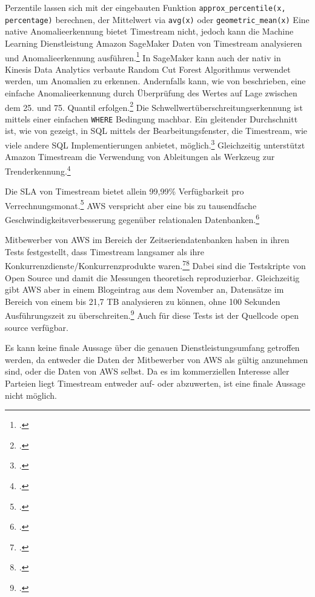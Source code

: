
\label{anhang:vergleich-timestream}
Perzentile lassen sich mit der eingebauten Funktion \texttt{approx_percentile(x, percentage)} berechnen, der Mittelwert via \texttt{avg(x)} oder \texttt{geometric_mean(x)}
Eine native Anomalieerkennung bietet Timestream nicht, jedoch kann die Machine Learning Dienstleistung Amazon SageMaker Daten von Timestream analysieren und Anomalieerkennung ausführen.\footcite[Vgl. auch im Folgenden][]{AmazonWebServicesInc..o.J.aj} In SageMaker kann auch der nativ in Kinesis Data Analytics verbaute Random Cut Forest Algorithmus verwendet werden, um Anomalien zu erkennen. Andernfalls kann, wie von \citeauthor{Salgado.2019} beschrieben, eine einfache Anomalieerkennung durch Überprüfung des Wertes auf Lage zwischen dem 25. und 75. Quantil erfolgen.\footcite[Vgl.][]{Salgado.2019}
Die Schwellwertüberschreitungserkennung ist mittels einer einfachen \texttt{WHERE} Bedingung machbar.
Ein gleitender Durchschnitt ist, wie von \citeauthor{Ross.2020} gezeigt, in SQL mittels der Bearbeitungsfenster, die Timestream, wie viele andere \ac{SQL} Implementierungen anbietet, möglich.\footcite[Vgl.][]{Ross.2020} Gleichzeitig unterstützt Amazon Timestream die Verwendung von Ableitungen als Werkzeug zur Trenderkennung.\footcite[Vgl.][]{AmazonWebServicesInc..o.J.ai}

Die \ac{SLA} von Timestream bietet allein 99,99\% Verfügbarkeit pro Verrechnungsmonat.\footcite[Vgl.][]{AmazonWebServicesInc..2020d} \ac{AWS} verspricht aber eine bis zu tausendfache Geschwindigkeitsverbesserung gegenüber relationalen Datenbanken.\footcite[Vgl.][]{AmazonWebServicesInc..o.J.ak}

Mitbewerber von \ac{AWS} im Bereich der Zeitseriendatenbanken haben in ihren Tests festgestellt, dass Timestream langsamer als ihre Konkurrenzdienste/Konkurrenzprodukte waren.\footcite[Vgl.][]{Booz.2020}\nzitat\footcite[Vgl.][]{Crate.ioInc..2020} Dabei sind die Testskripte von \citeauthor{Booz.2020} Open Source und damit die Messungen theoretisch reproduzierbar. Gleichzeitig gibt \ac{AWS} aber in einem Blogeintrag aus dem November an, Datensätze im Bereich von einem bis 21,7 TB analysieren zu können, ohne 100 Sekunden Ausführungszeit zu überschreiten.\footcite[Vgl.][]{Das.2020} Auch für diese Tests ist der Quellcode open source verfügbar.

Es kann keine finale Aussage über die genauen Dienstleistungsumfang getroffen werden, da entweder die Daten der Mitbewerber von \ac{AWS} als gültig anzunehmen sind, oder die Daten von \ac{AWS} selbst. Da es im kommerziellen Interesse aller Parteien liegt Timestream entweder auf- oder abzuwerten, ist eine finale Aussage nicht möglich.

